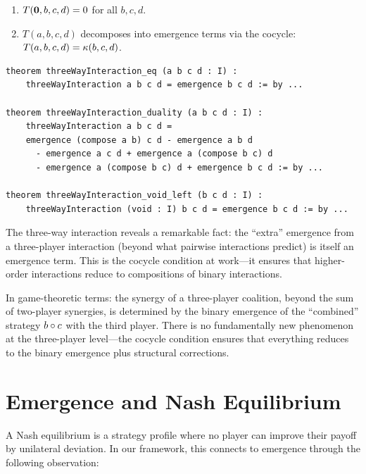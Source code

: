 \begin{theorem}
\label{thm:three-way-properties}
\begin{enumerate}
  \item $T(\mathbf{0}, b, c, d) = 0$ for all $b, c, d$.
  \item $T(a, b, c, d)$ decomposes into emergence terms via the cocycle:
    $T(a,b,c,d) = \kappa(b, c, d)$.
\end{enumerate}
\end{theorem}

\begin{lstlisting}[caption={Three-way interaction (IDT\_v3\_Emergence.lean)}]
theorem threeWayInteraction_eq (a b c d : I) :
    threeWayInteraction a b c d = emergence b c d := by ...

theorem threeWayInteraction_duality (a b c d : I) :
    threeWayInteraction a b c d =
    emergence (compose a b) c d - emergence a b d
      - emergence a c d + emergence a (compose b c) d
      - emergence a (compose b c) d + emergence b c d := by ...

theorem threeWayInteraction_void_left (b c d : I) :
    threeWayInteraction (void : I) b c d = emergence b c d := by ...
\end{lstlisting}

\begin{interpretation}
The three-way interaction reveals a remarkable fact: the ``extra'' emergence
from a three-player interaction (beyond what pairwise interactions predict) is
itself an emergence term. This is the cocycle condition at work---it ensures
that higher-order interactions reduce to compositions of binary interactions.

In game-theoretic terms: the synergy of a three-player coalition, beyond the
sum of two-player synergies, is determined by the binary emergence of the
``combined'' strategy $b \circ c$ with the third player. There is no
fundamentally new phenomenon at the three-player level---the cocycle condition
ensures that everything reduces to the binary emergence plus structural corrections.
\end{interpretation}


\section{Emergence and Nash Equilibrium}

A Nash equilibrium is a strategy profile where no player can improve their payoff
by unilateral deviation. In our framework, this connects to emergence through
the following observation:

